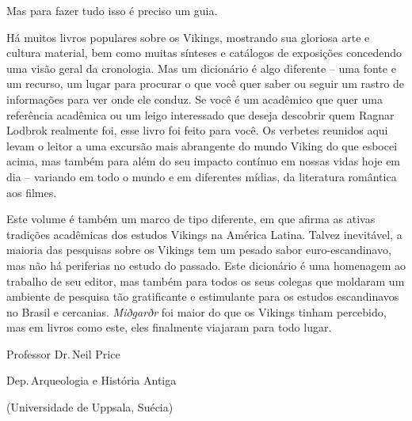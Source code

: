 Mas para fazer tudo isso é preciso um guia.

Há muitos livros populares sobre os Vikings, mostrando sua gloriosa arte
e cultura material, bem como muitas sínteses e catálogos de exposições
concedendo uma visão geral da cronologia. Mas um dicionário é algo
diferente -- uma fonte e um recurso, um lugar para procurar o que você
quer saber ou seguir um rastro de informações para ver onde ele conduz.
Se você é um acadêmico que quer uma referência acadêmica ou um leigo
interessado que deseja descobrir quem Ragnar Lodbrok realmente foi, esse
livro foi feito para você. Os verbetes reunidos aqui levam o leitor a
uma excursão mais abrangente do mundo Viking do que esbocei acima, mas
também para além do seu impacto contínuo em nossas vidas hoje em dia --
variando em todo o mundo e em diferentes mídias, da literatura romântica
aos filmes.

Este volume é também um marco de tipo diferente, em que afirma as ativas
tradições acadêmicas dos estudos Vikings na América Latina. Talvez
inevitável, a maioria das pesquisas sobre os Vikings tem um pesado sabor
euro-escandinavo, mas não há periferias no estudo do passado. Este
dicionário é uma
homenagem ao
trabalho de seu editor, mas também para todos os seus colegas que
moldaram um ambiente de pesquisa tão gratificante e estimulante para os
estudos escandinavos no Brasil e cercanias. \emph{Miðgarðr} foi maior do
que os Vikings tinham percebido, mas em livros como este, eles
finalmente viajaram para todo lugar.\medskip

\EP[2]
\hfill Professor Dr.\,Neil Price

\hfill Dep.\,Arqueologia e História Antiga 

\hfill (Universidade de Uppsala, Suécia)
